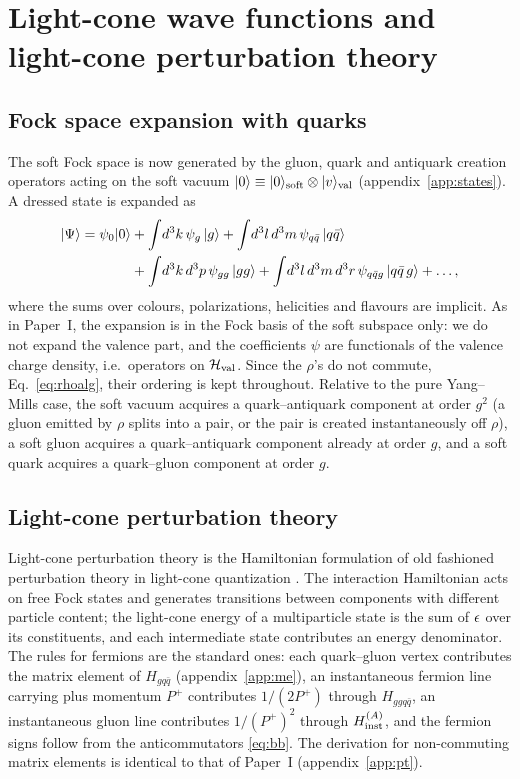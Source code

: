 \section{Light-cone wave functions and light-cone perturbation theory}
\label{sec:lcwf}

\subsection{Fock space expansion with quarks}
\label{sec:fock}

The soft Fock space is now generated by the gluon, quark and antiquark creation operators acting
on the soft vacuum $|0\rangle\equiv|0\rangle_{\rm soft}\otimes|v\rangle_{\rm val}$ (appendix~\ref{app:states}).
A dressed state is expanded as
\begin{align}
\left|\Psi\right\rangle=\psi_{0}|0\rangle&+\int\!d^{3}k\,\psi_{g}\left|g\right\rangle+\int\!d^{3}l\,d^{3}m\,\psi_{q\bar q}\left|q\bar q\right\rangle
\nonumber\\
&+\int\!d^{3}k\,d^{3}p\,\psi_{gg}\left|gg\right\rangle+\int\!d^{3}l\,d^{3}m\,d^{3}r\,\psi_{q\bar qg}\left|q\bar q\,g\right\rangle+\dots,
\label{eq:fock}
\end{align}
where the sums over colours, polarizations, helicities and flavours are implicit. As in Paper~I,
the expansion is in the Fock basis of the soft subspace only: we do not expand the valence part,
and the coefficients $\psi$ are functionals of the valence charge density, i.e.\ operators on
$\mathcal H_{\rm val}$. Since the $\rho$'s do not commute, Eq.~\eqref{eq:rhoalg}, their ordering
is kept throughout. Relative to the pure Yang--Mills case, the soft vacuum acquires a
quark--antiquark component at order $g^{2}$ (a gluon emitted by $\rho$ splits into a pair, or the
pair is created instantaneously off $\rho$), a soft gluon acquires a quark--antiquark component
already at order $g$, and a soft quark acquires a quark--gluon component at order $g$.

\subsection{Light-cone perturbation theory}
\label{sec:lcpt}

Light-cone perturbation theory is the Hamiltonian formulation of old fashioned perturbation
theory in light-cone quantization \cite{Lepage:1980fj,Brodsky:1997de,Kogut:1969xa}. The
interaction Hamiltonian acts on free Fock states and generates transitions between components
with different particle content; the light-cone energy of a multiparticle state is the sum of
$\epsilon$ over its constituents, and each intermediate state contributes an energy denominator. The
rules for fermions are the standard ones: each quark--gluon vertex contributes the matrix element
of $H_{gq\bar q}$ (appendix~\ref{app:me}), an instantaneous fermion line carrying plus momentum
$P^{+}$ contributes $1/(2P^{+})$ through $H_{ggq\bar q}$, an instantaneous gluon line contributes
$1/(P^{+})^{2}$ through $H^{(A)}_{\rm inst}$, and the fermion signs follow from the
anticommutators \eqref{eq:bb}. The derivation for non-commuting matrix elements is identical to
that of Paper~I (appendix~\ref{app:pt}).

